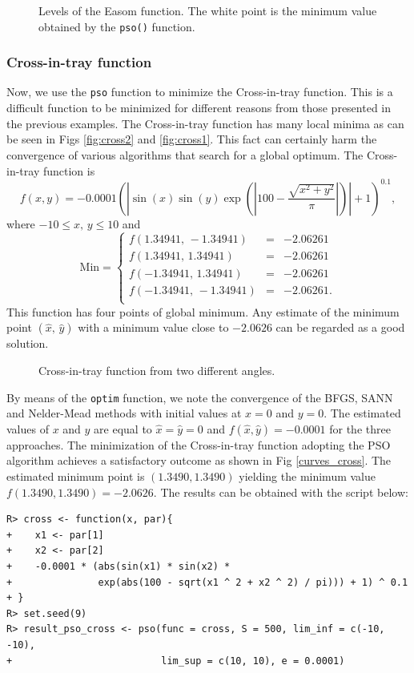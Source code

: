 \documentclass[10pt,letterpaper]{article}
\begin{document}
\begin{figure}[H]
\centering
\caption{Levels of the Easom function.
The white point is the minimum value obtained by the \texttt{pso()} function.}
\label{curves_easom}
\end{figure}

\subsubsection{Cross-in-tray function}

Now, we use the \texttt{pso} function to minimize the Cross-in-tray function.
This is a difficult function to be minimized for different reasons from
those presented in the previous examples.
The Cross-in-tray function has many local minima as  can be seen in Figs \ref{fig:cross2}
and \ref{fig:cross1}.
This fact can certainly harm the convergence of various algorithms that search for a global optimum.
The Cross-in-tray function is
$$f(x,y) = -0.0001 \left(\left| \sin(x) \sin(y) \exp\left({\left|100 - \frac{\sqrt{x^2 + y^2}}{\pi}\right|}\right)\right| +1 \right)^{0.1},$$
where $-10 \leq x,\, y \leq 10$ and
$$
\mathrm{Min} = \left\{
\begin{array}{ccc}
f(1.34941,\,-1.34941) & = & -2.06261
\\
f(1.34941,\,1.34941) & = & -2.06261
\\
f(-1.34941,\,1.34941) & = & -2.06261
\\
f(-1.34941,\,-1.34941) & = & -2.06261.
\\
\end{array}
\right.
$$
This function has four points of global minimum.
Any estimate of the minimum point $(\widehat{x},\,\widehat{y})$ with a minimum value close to $-2.0626$ can be regarded as a good solution.

\begin{figure}[H]
\centering
\subfigure{
	\label{fig:cross2}
}
\subfigure{
	\label{fig:cross1}
}
\caption{Cross-in-tray function from two different angles.}
\label{fig:cross}
\end{figure}


By means of the \texttt{optim} function, we note the convergence of the BFGS, SANN and Nelder-Mead methods with initial values at $x=0$ and $y=0$.
The estimated values of $x$ and $y$ are equal to $\widehat{x}=\widehat{y}=0$ and $f(\widehat{x},\widehat{y})=-0.0001$ for the three approaches.
The minimization of the Cross-in-tray function adopting the PSO algorithm achieves a satisfactory outcome as shown in Fig \ref{curves_cross}.
The estimated minimum point is $(1.3490,1.3490)$ yielding the minimum value $f(1.3490,1.3490) = -2.0626$.
The results can be obtained with the script below:
\begin{verbatim}
R> cross <- function(x, par){
+    x1 <- par[1]
+    x2 <- par[2]
+    -0.0001 * (abs(sin(x1) * sin(x2) *
+               exp(abs(100 - sqrt(x1 ^ 2 + x2 ^ 2) / pi))) + 1) ^ 0.1
+ }
R> set.seed(9)
R> result_pso_cross <- pso(func = cross, S = 500, lim_inf = c(-10, -10),
+                          lim_sup = c(10, 10), e = 0.0001)
\end{verbatim}
\end{document}
